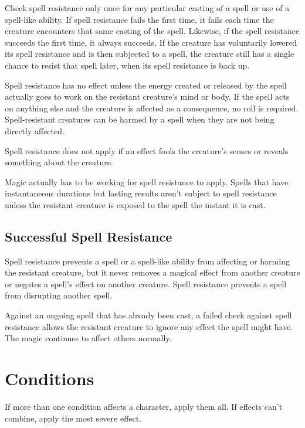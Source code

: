 Check spell resistance only once for any particular casting of a spell or use of a spell-like ability. If spell resistance fails the first time, it fails each time the creature encounters that same casting of the spell. Likewise, if the spell resistance succeeds the first time, it always succeeds. If the creature has voluntarily lowered its spell resistance and is then subjected to a spell, the creature still has a single chance to resist that spell later, when its spell resistance is back up.
				
Spell resistance has no effect unless the energy created or released by the spell actually goes to work on the resistant creature's mind or body. If the spell acts on anything else and the creature is affected as a consequence, no roll is required. Spell-resistant creatures can be harmed by a spell when they are not being directly affected. 
				
Spell resistance does not apply if an effect fools the creature's senses or reveals something about the creature.
				
Magic actually has to be working for spell resistance to apply. Spells that have instantaneous durations but lasting results aren't subject to spell resistance unless the resistant creature is exposed to the spell the instant it is cast. 
				
\subsection{Successful Spell Resistance}

				
Spell resistance prevents a spell or a spell-like ability from affecting or harming the resistant creature, but it never removes a magical effect from another creature or negates a spell's effect on another creature. Spell resistance prevents a spell from disrupting another spell.
				
Against an ongoing spell that has already been cast, a failed check against spell resistance allows the resistant creature to ignore any effect the spell might have. The magic continues to affect others normally.
				
\section{Conditions}

				
If more than one condition affects a character, apply them all. If effects can't combine, apply the most severe effect.
				
